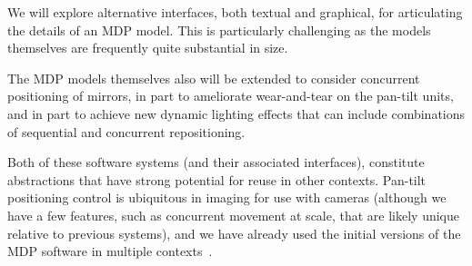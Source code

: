 We will explore alternative interfaces, both textual and graphical,
for articulating the details of an MDP model.  This is particularly
challenging as the models themselves are frequently quite substantial
in size.

The MDP models themselves also will be extended to consider concurrent
positioning of mirrors, in part to ameliorate wear-and-tear on the
pan-tilt units, and in part to achieve new dynamic lighting effects
that can include combinations of sequential and concurrent
repositioning.

Both of these software systems (and their associated interfaces), constitute
abstractions that have strong potential for reuse in other contexts.
Pan-tilt positioning control is ubiquitous in imaging for use
with cameras (although we have a few features, such as concurrent movement
at scale, that are likely unique relative to previous systems),
and we have already used the initial versions of the MDP
software in multiple contexts~\cite{mskgct13,tggs10}.
